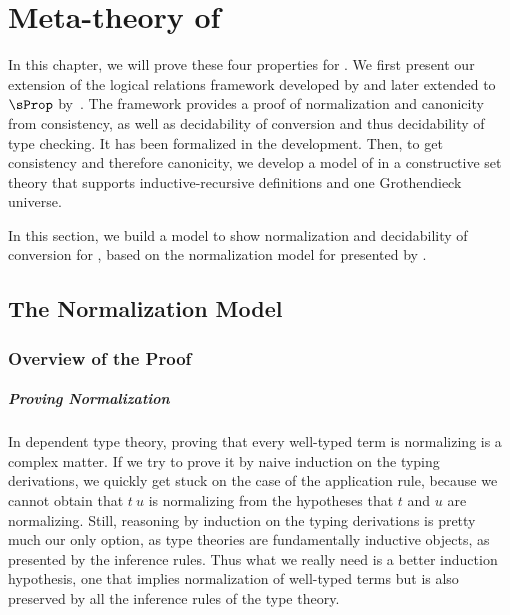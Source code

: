 \setchapterpreamble[u]{\margintoc}
\chapter{Meta-theory of \SetoidCC}

In this chapter, we will prove these four properties for \SetoidCC.
%
We first present our extension of the
logical relations framework developed by  and
later extended to $\sProp$ by~. The
framework provides a proof of normalization and canonicity from
consistency, as well as decidability of conversion and thus decidability of
type checking.
%
It has been formalized in the \Agda development.
%
Then, to get consistency and therefore canonicity, we develop a model of
\SetoidCC in a constructive set theory that supports inductive-recursive definitions and one
Grothendieck universe.

In this section, we build a model to show normalization and decidability of 
conversion for \SetoidCC, based on the normalization model for \MLTT presented 
by .

\section{The Normalization Model}
\label{sec:logic-relat-with}

\subsection{Overview of the Proof}

\paragraph*{Proving Normalization}

In dependent type theory, proving that every well-typed term is normalizing 
is a complex matter.
% 
If we try to prove it by naive induction on the typing derivations, we quickly 
get stuck on the case of the application rule, because we cannot obtain that 
\( t~u \) is normalizing from the hypotheses that $t$ and $u$ are normalizing.
%
Still, reasoning by induction on the typing derivations is pretty much our only 
option, as type theories are fundamentally inductive objects, as presented by 
the inference rules.
% 
Thus what we really need is a better induction hypothesis, one that implies
normalization of well-typed terms but is also preserved by all the inference 
rules of the type theory.

